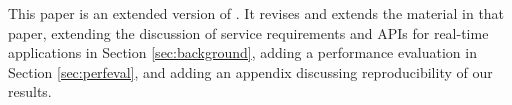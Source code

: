 This paper is an extended version of \cite{mcquistin:2016:tcp-hollywood}.
It revises and extends the material in that paper, extending the discussion 
of service requirements and APIs for real-time applications in Section
\ref{sec:background}, adding a performance evaluation in Section
\ref{sec:perfeval}, and adding an appendix discussing reproducibility of
our results.

